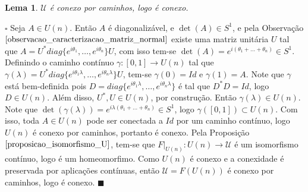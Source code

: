 \documentclass[12pt]{book}
\newtheorem{lema}[teorema]{Lema}
\newenvironment{prova}[1]{$\square$ #1}{\hfill$\blacksquare$}
\newcommand{\circulo}{S^{1}}
\newcommand{\matrizSimpleticaOrtogonal}{\mathcal{U}}
\newcommand{\matrizunitaria}[1]{U(#1)}
\begin{document}
	
	\begin{lema}\label{lema_conexidade_matriz_unitaria}
		$\matrizSimpleticaOrtogonal$ é conexo por caminhos, logo é conexo.
	\end{lema}
	\begin{prova}
		Seja $A \in \matrizunitaria{n}$. Então $A$ é diagonalizável, e $\det(A) \in S^{1}$, e pela Observação $\ref{observacao_caracterizacao_matriz_normal}$ existe uma matriz unitária $U$ tal que $A=U^{*}diag\{e^{i\theta_{1}}, \dots, e^{i\theta_{n}}\}U$, com isso tem-se $\det(A) = e^{i(\theta_{1}+\dots+\theta_{n})} \in \circulo$. Definindo o caminho contínuo $\gamma:[0,1] \to \matrizunitaria{n}$ tal que $\gamma(\lambda)=U^{*}diag\{e^{i\theta_{1}\lambda}, \dots, e^{i\theta_{n}\lambda}\}U$, tem-se $\gamma(0)=Id$ e $\gamma(1)=A$. Note que $\gamma$ está bem-definida pois $D=diag\{e^{i\theta_{1}\lambda}, \dots, e^{i\theta_{n}\lambda}\}$ é tal que $D^{*}D = Id$, logo $D \in \matrizunitaria{n}$. Além disso, $U^{*}, U \in \matrizunitaria{n}$, por construção. Então $\gamma(\lambda) \in \matrizunitaria{n}$. Note que $\det(\gamma(\lambda)) = e^{i\lambda(\theta_{1}+\dots+\theta_{n})} \in \circulo$, logo $\gamma([0,1]) \subset \matrizunitaria{n}$. Com isso, toda $A \in \matrizunitaria{n}$ pode ser conectada a $Id$ por um caminho contínuo, logo $\matrizunitaria{n}$ é conexo por caminhos, portanto é conexo. Pela Proposição $\ref{proposicao_isomorfismo_U}$, tem-se que $F|_{\matrizunitaria{n}}:\matrizunitaria{n} \to \matrizSimpleticaOrtogonal$ é um isomorfismo contínuo, logo é um homeomorfimo. Como $\matrizunitaria{n}$ é conexo e a conexidade é preservada por aplicações contínuas, então $\matrizSimpleticaOrtogonal = F(\matrizunitaria{n})$ é conexo por caminhos, logo é conexo.
	\end{prova}
	
\end{document}
